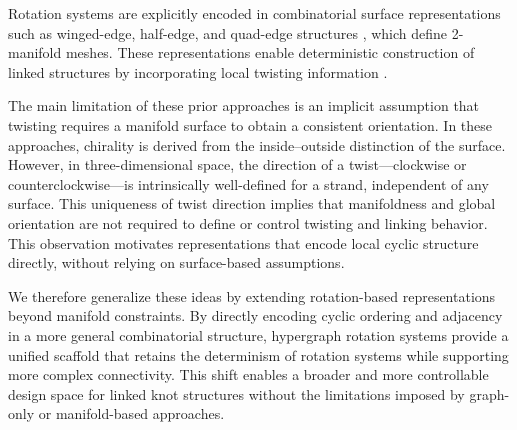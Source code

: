 \documentclass[acmtog,anonymous,review]{acmart}
\begin{document}
Rotation systems are explicitly encoded in combinatorial surface representations such as winged-edge, half-edge, and quad-edge structures \citep{baumgart1972,mantyla1988,guibas1985,akleman1999}, which define 2-manifold meshes. These representations enable deterministic construction of linked structures by incorporating local twisting information \citep{akleman2009cyclic,akleman2015extended,xing2010single,lipschutz2022linkedknots,sequin2021polyhedral}. 



The main limitation of these prior approaches is an implicit assumption that twisting requires a manifold surface to obtain a consistent orientation. In these approaches, chirality is derived from the inside–outside distinction of the surface. However, in three-dimensional space, the direction of a twist—clockwise or counterclockwise—is intrinsically well-defined for a strand, independent of any surface. This uniqueness of twist direction implies that manifoldness and global orientation are not required to define or control twisting and linking behavior. This observation motivates representations that encode local cyclic structure directly, without relying on surface-based assumptions.

We therefore generalize these ideas by extending rotation-based representations beyond manifold constraints. By directly encoding cyclic ordering and adjacency in a more general combinatorial structure, hypergraph rotation systems provide a unified scaffold that retains the determinism of rotation systems while supporting more complex connectivity. This shift enables a broader and more controllable design space for linked knot structures without the limitations imposed by graph-only or manifold-based approaches.
\end{document}
